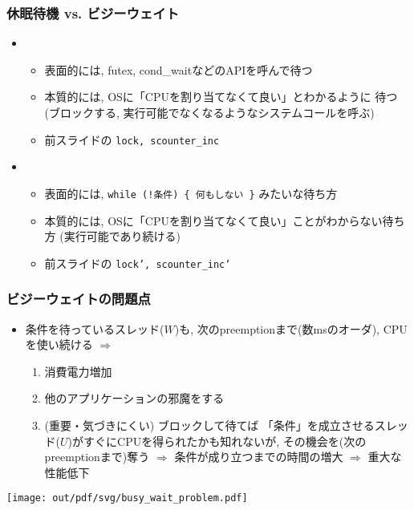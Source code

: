 \documentclass[12pt,dvipdfmx]{beamer}
\begin{document}
\begin{frame}[fragile]
  \frametitle{休眠待機 vs. ビジーウェイト}
  \begin{itemize}
  \item {}
    \begin{itemize}
    \item 表面的には, futex, cond\_waitなどのAPIを呼んで待つ
    \item 本質的には, OSに「CPUを割り当てなくて良い」とわかるように
      待つ(ブロックする, 実行可能でなくなるようなシステムコールを呼ぶ)
    \item 前スライドの {\tt lock, scounter\_inc}
    \end{itemize}
  \item {}
    \begin{itemize}
    \item 表面的には, {\tt while (!条件) \{ 何もしない \}} みたいな待ち方
    \item 本質的には, OSに「CPUを割り当てなくて良い」ことがわからない待ち方
      (実行可能であり続ける)
    \item 前スライドの {\tt lock', scounter\_inc'}
    \end{itemize}
  \end{itemize}
\end{frame}

\begin{frame}[fragile]
  \frametitle{ビジーウェイトの問題点}
  \begin{itemize}
  \item[] 条件を待っているスレッド($W$)も, 
    次のpreemptionまで(数msのオーダ), CPUを使い続ける $\Rightarrow$
    \begin{enumerate}
    \item 消費電力増加
    \item 他のアプリケーションの邪魔をする
    \item (重要・気づきにくい)
      ブロックして待てば
      「条件」を成立させるスレッド($U$)がすぐにCPUを得られたかも知れないが,
      その機会を(次のpreemptionまで)奪う
      $\Rightarrow$ 条件が成り立つまでの時間の増大
      $\Rightarrow$ 重大な性能低下
    \end{enumerate}
  \end{itemize}
  \begin{center}
    \texttt{[image: out/pdf/svg/busy\_wait\_problem.pdf]}
  \end{center}
\end{frame}
\end{document}
